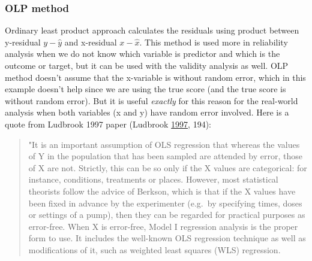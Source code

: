 \documentclass[
]{book}
\newenvironment{Shaded}{\begin{snugshade}}{\end{snugshade}}
\newcommand{\CommentTok}[1]{\textcolor[rgb]{0.56,0.35,0.01}{\textit{#1}}}
\newcommand{\DecValTok}[1]{\textcolor[rgb]{0.00,0.00,0.81}{#1}}
\newcommand{\KeywordTok}[1]{\textcolor[rgb]{0.13,0.29,0.53}{\textbf{#1}}}
\newcommand{\NormalTok}[1]{#1}
\newcommand{\OperatorTok}[1]{\textcolor[rgb]{0.81,0.36,0.00}{\textbf{#1}}}
\begin{document}
\begin{Shaded}
\end{Shaded}

\hypertarget{olp-method}{%
\subsubsection{OLP method}\label{olp-method}}

Ordinary least product approach calculates the residuals using product between y-residual \(y - \hat{y}\) and x-residual \(x - \hat{x}\). This method is used more in reliability analysis when we do not know which variable is predictor and which is the outcome or target, but it can be used with the validity analysis as well. OLP method doesn't assume that the x-variable is without random error, which in this example doesn't help since we are using the true score (and the true score is without random error). But it is useful \emph{exactly} for this reason for the real-world analysis when both variables (x and y) have random error involved. Here is a quote from Ludbrook 1997 paper (Ludbrook \protect\hyperlink{ref-ludbrookSPECIALARTICLECOMPARING1997}{1997}, 194):

\begin{quote}
"It is an important assumption of OLS regression that whereas the values of Y in the population that has been sampled are attended by error, those of X are not. Strictly, this can be so only if the X values are categorical: for instance, conditions, treatments or places. However, most statistical theorists follow the advice of Berkson, which is that if the X values have been fixed in advance by the experimenter (e.g.~by specifying times, doses or settings of a pump), then they can be regarded for practical purposes as error-free. When X is error-free, Model I regression analysis is the proper form to use. It includes the well-known OLS regression technique as well as modifications of it, such as weighted least squares (WLS) regression.
\end{quote}
\end{document}
